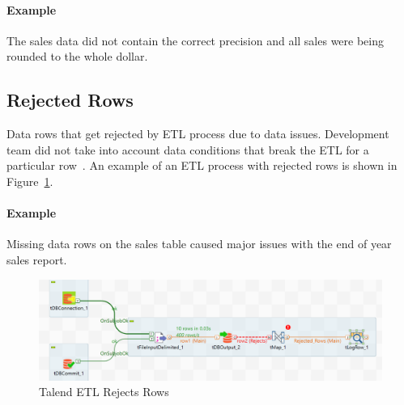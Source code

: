 \paragraph*{Example} The sales data did not contain the correct precision and all sales were being rounded to the whole dollar.

\subsection*{Rejected Rows}

Data rows that get rejected by ETL process due to data issues.
Development team did not take into account data conditions that break the ETL for a particular row~\cite{web:common-defects}.
An example of an ETL process with rejected rows is shown in Figure~\ref{fig:rejected-rows}.

\paragraph*{Example} Missing data rows on the sales table caused major issues with the end of year sales report.

\begin{figure}[htb]
    \centering
    \includegraphics[width=.8\textwidth]{figures/rejected-rows.png}
    \caption{Talend ETL Rejects Rows}
    \label{fig:rejected-rows}
\end{figure}
\FloatBarrier






